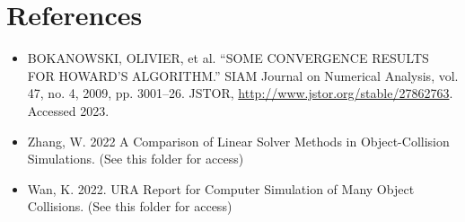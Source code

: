 \documentclass[12pt]{article}
\begin{document}
\section{References}

\begin{itemize}
   \item BOKANOWSKI, OLIVIER, et al. “SOME CONVERGENCE RESULTS FOR HOWARD'S ALGORITHM.” SIAM Journal on Numerical Analysis, vol. 47, no. 4, 2009, pp. 3001–26. JSTOR, \href{http://www.jstor.org/stable/27862763}{http://www.jstor.org/stable/27862763}. Accessed 2023.
   \item Zhang, W. 2022 A Comparison of Linear Solver Methods in Object-Collision Simulations. (See this folder for access)
   \item Wan, K. 2022. URA Report for Computer Simulation of Many Object Collisions. (See this folder for access)
\end{itemize}
\end{document}
